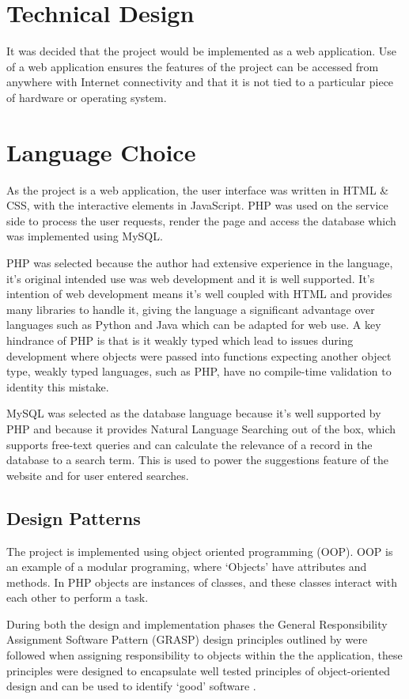 \section{Technical Design}
It was decided that the project would be implemented as a web application. Use of a web application ensures the features of the project can be accessed from anywhere with Internet connectivity and that it is not tied to a particular piece of hardware or operating system.

\section{Language Choice}
As the project is a web application, the user interface was written in HTML \& CSS, with the interactive elements in JavaScript. PHP was used on the service side to process the user requests, render the page and access the database which was implemented using MySQL.
 
PHP was selected because the author had extensive experience in the language, it's original intended use was web development and it is well supported. It's intention of web development means it's well coupled with HTML and provides many libraries to handle it, giving the language a significant advantage over languages such as Python and Java which can be adapted for web use. A key hindrance of PHP is that is it weakly typed which lead to issues during development where objects were passed into functions expecting another object type, weakly typed languages, such as PHP, have no compile-time validation to identity this mistake. 

MySQL was selected as the database language because it's well supported by PHP and because it provides Natural Language Searching out of the box, which supports free-text queries and can calculate the relevance of a record in the database to a search term. This is used to power the suggestions feature of the website and for user entered searches.

\subsection{Design Patterns}
The project is implemented using object oriented programming (OOP). OOP is an example of a modular programing, where `Objects' have attributes and methods. In PHP objects are instances of classes, and these classes interact with each other to perform a task.

During both the design and implementation phases the General Responsibility Assignment Software Pattern (GRASP) design principles outlined by   were followed when assigning responsibility to objects within the the application, these principles were designed to encapsulate well tested principles of object-oriented design and can be used to identify `good' software \parencite{larman1997applying}. 

